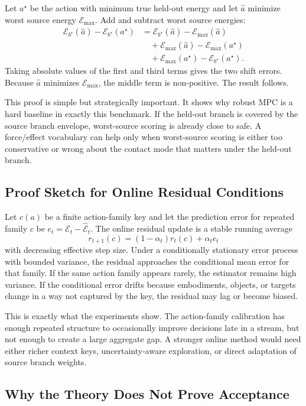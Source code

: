 \documentclass{article}
\newcommand{\energy}{\mathcal{E}}
\begin{document}
Let $a^\star$ be the action with minimum true held-out energy and let $\hat a$ minimize worst source energy $\energy_{\max}$. Add and subtract worst source energies:
\[
\begin{aligned}
\energy_{b^\star}(\hat a)-\energy_{b^\star}(a^\star)
&=
\energy_{b^\star}(\hat a)-\energy_{\max}(\hat a)\\
&\quad+
\energy_{\max}(\hat a)-\energy_{\max}(a^\star)\\
&\quad+
\energy_{\max}(a^\star)-\energy_{b^\star}(a^\star).
\end{aligned}
\]
Taking absolute values of the first and third terms gives the two shift errors. Because $\hat a$ minimizes $\energy_{\max}$, the middle term is non-positive. The result follows.

This proof is simple but strategically important. It shows why robust MPC is a hard baseline in exactly this benchmark. If the held-out branch is covered by the source branch envelope, worst-source scoring is already close to safe. A force/effect vocabulary can help only when worst-source scoring is either too conservative or wrong about the contact mode that matters under the held-out branch.

\subsection{Proof Sketch for Online Residual Conditions}

Let $c(a)$ be a finite action-family key and let the prediction error for repeated family $c$ be $e_t=\energy_t-\hat{\energy}_t$. The online residual update is a stable running average
\[
r_{t+1}(c)=(1-\alpha_t)r_t(c)+\alpha_t e_t
\]
with decreasing effective step size. Under a conditionally stationary error process with bounded variance, the residual approaches the conditional mean error for that family. If the same action family appears rarely, the estimator remains high variance. If the conditional error drifts because embodiments, objects, or targets change in a way not captured by the key, the residual may lag or become biased.

This is exactly what the experiments show. The action-family calibration has enough repeated structure to occasionally improve decisions late in a stream, but not enough to create a large aggregate gap. A stronger online method would need either richer context keys, uncertainty-aware exploration, or direct adaptation of source branch weights.

\subsection{Why the Theory Does Not Prove Acceptance}
\end{document}
